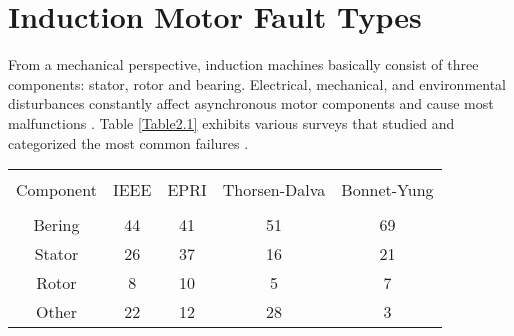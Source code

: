 
\section{Induction Motor Fault Types}

From a mechanical perspective, induction machines basically consist of three components: stator, rotor and bearing. Electrical, mechanical, and environmental disturbances constantly affect asynchronous motor components and cause most malfunctions \cite{bonnet2010}. Table \ref{Table2.1} exhibits various surveys that studied and categorized the most common failures \cite{motor1985report,albrecht1986assessment,albrecht1987assessment,thorsen1995survey,bonnett2008increased}. 

\begin{table*}[h]
	{\setlength{\tabcolsep}{12pt}
		\caption{Table with single row and centered columns.}
		\begin{center}
			\vspace{-6mm}
			\begin{tabular}{ccccc}
				\hline \\[-2.45ex] \hline \\[-2.1ex]
				Component & IEEE & EPRI & Thorsen-Dalva & Bonnet-Yung \\
				\hline \\[-1.8ex]
				Bering & 44 & 41 & 51 & 69 \\
				Stator & 26 & 37  & 16 & 21\\
				Rotor & 8 & 10 & 5 & 7 \\
				Other & 22 & 12  & 28 & 3\\
				\hline
			\end{tabular}
			\vspace{-6mm}
		\end{center}
		\label{Table2.1}}
\end{table*}

